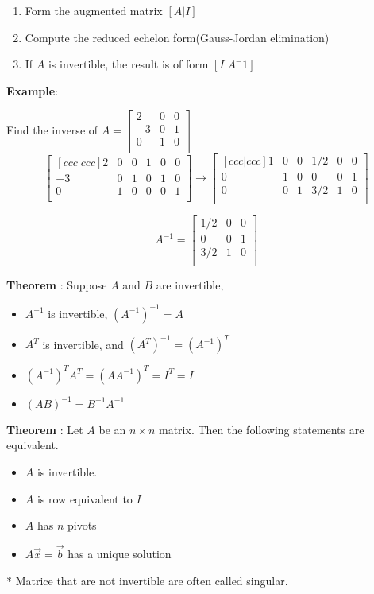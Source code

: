 \documentclass{article}
\begin{document}
{

\begin{enumerate}
\item Form the augmented matrix $[A|I]$
\item Compute the reduced echelon form(Gauss-Jordan elimination)
\item If $A$ is invertible, the result is of form $[I|A^-1]$
\end{enumerate}
}
{


\textbf{Example}: 

Find the inverse of $A = \begin{bmatrix}
    2 & 0 & 0  \\
    -3 & 0 & 1  \\
    0 & 1 & 0  \\
\end{bmatrix}$
\[
\begin{bmatrix}[ccc|ccc]
    2 & 0 & 0 & 1 & 0 & 0  \\
    -3 & 0 & 1 & 0 & 1 & 0  \\
    0 & 1 & 0 & 0 & 0 & 1  \\
\end{bmatrix}
\rightarrow
\begin{bmatrix}[ccc|ccc]
    1 & 0 & 0 & 1/2 & 0 & 0  \\
    0 & 1 & 0 & 0 & 0 & 1  \\
    0 & 0 & 1 & 3/2 & 1 & 0  \\
\end{bmatrix}
\]

\[
A^{-1} = \begin{bmatrix}
    1/2 & 0 & 0  \\
    0 & 0 & 1  \\
    3/2 & 1 & 0  \\
\end{bmatrix}
\]

\textbf{Theorem} : Suppose $A$ and $B$ are invertible,
\begin{itemize}
    \item $A^{-1}$ is invertible, $(A^{-1})^{-1} = A$
    \item $A^T$ is invertible, and $(A^T)^{-1} = (A^{-1})^{T}$ 
    \item $(A^{-1})^{T}A^T = (AA^{-1})^T = I^T = I$
    \item $(AB)^{-1} = B^{-1}A^{-1}$
\end{itemize}


\textbf{Theorem} : Let $A$ be an $n \times n$ matrix. Then the following statements are equivalent.
\begin{itemize}
    \item $A$ is invertible.
    \item $A$ is row equivalent to $I$
    \item $A$ has $n$ pivots
    \item $A\vec{x}=\vec{b}$ has a unique solution
\end{itemize}

* Matrice that are not invertible are often called singular.
}
\end{document}
